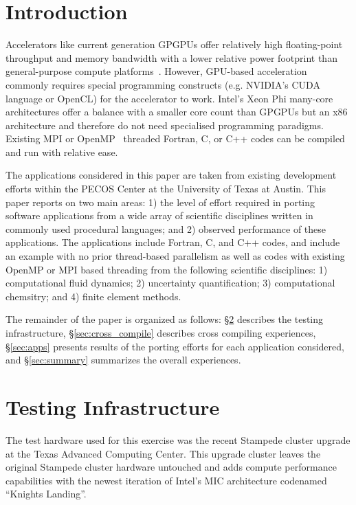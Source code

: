 \section{Introduction}
\label{sec:intro}

Accelerators like current generation GPGPUs offer relatively high
floating-point throughput and memory bandwidth with a lower relative power
footprint than general-purpose compute platforms~\cite{gpu_hpc:2009}. However,
GPU-based acceleration commonly requires special programming constructs (e.g.
NVIDIA's CUDA language\cite{} or OpenCL\cite{}) for the accelerator to work.
Intel's Xeon Phi many-core architectures offer a balance with a smaller core count than GPGPUs
but an x86 architecture and therefore do not need specialised programming
paradigms.  Existing MPI or OpenMP~\cite{openmp_standard} threaded Fortran, C,
or C++ codes can be compiled and run with relative ease.

The applications considered in this paper are taken from existing development
efforts within the PECOS Center at the University of Texas at Austin.  This
paper reports on two main areas: 1) the level of effort required in porting
software applications from a wide array of scientific disciplines written in
commonly used procedural languages; and 2) observed performance of these
applications.  The applications include Fortran, C, and C++ codes, and include
an example with no prior thread-based parallelism as well as codes with
existing OpenMP or MPI based threading from the following scientific
disciplines: 1) computational fluid dynamics; 2) uncertainty quantification;
3) computational chemsitry; and 4) finite element methods.

The remainder of the paper is organized as follows: \S\ref{sec:hardware}
describes the testing infrastructure, \S\ref{sec:cross_compile} describes cross
compiling experiences, \S\ref{sec:apps} presents results of the porting efforts
for each application considered, and \S\ref{sec:summary} summarizes the overall
experiences.

\section{Testing Infrastructure}
\label{sec:hardware}

The test hardware used for this exercise was the recent Stampede cluster
upgrade at the Texas Advanced Computing Center.  This upgrade cluster leaves
the original Stampede cluster hardware untouched and adds compute performance
capabilities with the newest iteration of Intel's MIC architecture codenamed
``Knights Landing''.

